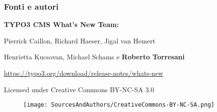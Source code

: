 \begin{frame}[fragile]
	\frametitle{Fonti e autori}

	\vspace{-0.6cm}

	\centerline{\textbf{TYPO3 CMS What's New Team:}}

	\begin{center}
		\centerline{Pierrick Caillon, Richard Haeser, Jigal van Hemert}
		\centerline{Henrietta Kucsovan, Michael Schams e \textbf{Roberto Torresani}}
	\end{center}

	\vspace{0.8cm}

	\smaller\begin{center}\url{https://typo3.org/download/release-notes/whats-new}\end{center}\normalsize

	\vspace{1cm}

	\smaller\begin{center}Licensed under Creative Commons BY-NC-SA 3.0\end{center}\normalsize
	\begin{figure}\vspace*{-0.4cm}
		\texttt{[image: SourcesAndAuthors/CreativeCommons-BY-NC-SA.png]}
	\end{figure}

\end{frame}


